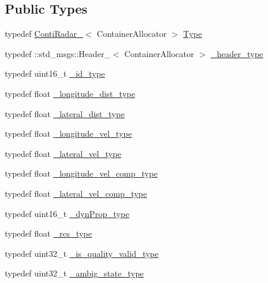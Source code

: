 \subsection*{Public Types}
\begin{DoxyCompactItemize}
\item 
typedef \hyperlink{structconti__radar_1_1ContiRadar__}{Conti\+Radar\+\_\+}$<$ Container\+Allocator $>$ \hyperlink{structconti__radar_1_1ContiRadar___ab750a8aec78c3a090439c7425be8e9fc}{Type}
\item 
typedef \+::std\+\_\+msgs\+::\+Header\+\_\+$<$ Container\+Allocator $>$ \hyperlink{structconti__radar_1_1ContiRadar___a0e76e7ae9ddced00c45c5935daea918f}{\+\_\+header\+\_\+type}
\item 
typedef uint16\+\_\+t \hyperlink{structconti__radar_1_1ContiRadar___aa24d813acf1184f22dbd33d1301d8887}{\+\_\+id\+\_\+type}
\item 
typedef float \hyperlink{structconti__radar_1_1ContiRadar___a165d35c3e291b895e03290883feaf8a9}{\+\_\+longitude\+\_\+dist\+\_\+type}
\item 
typedef float \hyperlink{structconti__radar_1_1ContiRadar___a2c5d5de6c5ec7dc7b53d84802b54d522}{\+\_\+lateral\+\_\+dist\+\_\+type}
\item 
typedef float \hyperlink{structconti__radar_1_1ContiRadar___af042240d6e52b741e4a641e13e8c0b09}{\+\_\+longitude\+\_\+vel\+\_\+type}
\item 
typedef float \hyperlink{structconti__radar_1_1ContiRadar___aa5af25dc9a77913381d78b94f4655ad5}{\+\_\+lateral\+\_\+vel\+\_\+type}
\item 
typedef float \hyperlink{structconti__radar_1_1ContiRadar___a3f85fb9d65be899731b3261b3e788197}{\+\_\+longitude\+\_\+vel\+\_\+comp\+\_\+type}
\item 
typedef float \hyperlink{structconti__radar_1_1ContiRadar___af4091d74d21fafb513e0815764836f98}{\+\_\+lateral\+\_\+vel\+\_\+comp\+\_\+type}
\item 
typedef uint16\+\_\+t \hyperlink{structconti__radar_1_1ContiRadar___aa7a6bebffccc2d73549b176d1230e1dc}{\+\_\+dyn\+Prop\+\_\+type}
\item 
typedef float \hyperlink{structconti__radar_1_1ContiRadar___a54a5686feab91c3c0cbd68cdb6bee7db}{\+\_\+rcs\+\_\+type}
\item 
typedef uint32\+\_\+t \hyperlink{structconti__radar_1_1ContiRadar___a03d5186874dd855dae68a07e423d9825}{\+\_\+is\+\_\+quality\+\_\+valid\+\_\+type}
\item 
typedef uint32\+\_\+t \hyperlink{structconti__radar_1_1ContiRadar___a193834825a012bc4ef64220db985d2eb}{\+\_\+ambig\+\_\+state\+\_\+type}

\end{DoxyCompactItemize}
